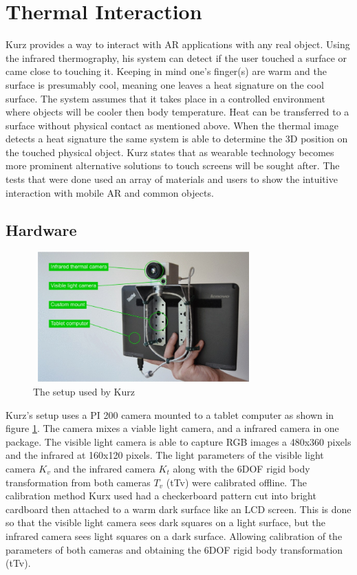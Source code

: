\documentclass{sig-alternate}
\begin{document}
\section{Thermal Interaction}
\label{sec:Thermal Interaction}

Kurz \cite{Thermal} provides a way to interact with AR applications with any real object. Using the infrared thermography, his system can detect if the user touched a surface or came close to touching it. Keeping in mind one's finger(s) are warm and the surface is presumably cool, meaning one leaves a heat signature on the cool surface. The system assumes that it takes place in a controlled environment where objects will be cooler then body temperature. Heat can be transferred to a surface without physical contact as mentioned above. When the thermal image detects a heat signature the same system is able to determine the 3D position on the touched physical object. Kurz \cite{Thermal} states that as wearable technology becomes more prominent alternative solutions to touch screens will be sought after. The tests that were done used an array of materials and users to show the intuitive interaction with mobile AR and common objects.

\subsection{Hardware}
\label{Hardware}

\begin{figure}
	\includegraphics[width=8.5cm, height=5cm]{Hardware2}
	\caption{The setup used by Kurz \cite{Thermal}}
	\label{fig:hardware}
\end{figure}

Kurz's \cite{Thermal} setup uses a PI 200 camera mounted to a tablet computer as shown in figure \ref{fig:hardware}. The camera mixes a viable light camera, and a infrared camera in one package. The visible light camera is able to capture RGB images a 480x360 pixels and the infrared at 160x120 pixels. The light parameters of the visible light camera \(K_v\) and the infrared camera \(K_t\) along with the 6DOF rigid body transformation from both cameras \(T_v\) (tTv) were calibrated offline. The calibration method Kurx used had a checkerboard pattern cut into bright cardboard then attached to a warm dark surface like an LCD screen. This is done so that the visible light camera sees dark squares on a light surface, but the infrared camera sees light squares on a dark surface. Allowing calibration of the parameters of both cameras and obtaining the 6DOF rigid body transformation (tTv).
\end{document}
